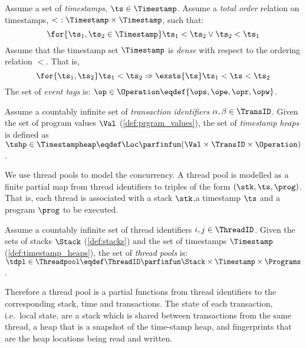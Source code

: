 \begin{definition}\label{def:timestamp_heaps}
Assume a set of \emph{timestamps}, $\ts \in \Timestamp$. Assume a \emph{total order} relation on timestamps, $<\ : \Timestamp \times \Timestamp$, such that:
%
\[
	\for{\ts_1, \ts_2 \in \Timestamp} \ts_1 < \ts_2 \lor \ts_2 < \ts_1
\]
%
Assume that the timestamp set $\Timestamp$ is \emph{dense} with respect to the ordering relation $<$. That is,
\[
	\for{\ts_1, \ts_2} \ts_1 < \ts_2 
	\Rightarrow 
	\exsts{\ts} \ts_1 < \ts < \ts_2	
\]
%
The set of \emph{event tags} is: $\op \in \Operation \eqdef \{\ops, \ope, \opr, \opw \}$. 

\noindent Assume a countably infinite set of \emph{transaction identifiers} $\alpha, \beta \in \TransID$.
Given the set of program values $\Val$ (\ref{def:prgram_values}), the set of \emph{timestamp heaps} is defined as $\tshp \in \Timestampheap \eqdef \Loc \parfinfun (\Val \times \TransID \times \Operation)$.
\end{definition}

We use thread pools to model the concurrency.
A thread pool is modelled as a finite partial map from thread identifiers to triples of the form $(\stk, \ts, \prog)$. That is, each thread is associated with a stack $\stk$,a timestamp $\ts$ and a program $\prog$ to be executed. 

\begin{definition}
Assume a countably infinite set of thread identifiers $i,j \in \ThreadID$.
Given the sets of stacks $\Stack$ (\ref{def:stacks}) and the set of timestamps $\Timestamp$ (\ref{def:timestamp_heaps}), the set of \emph{thread pools} is: $\tdpl \in \Threadpool \eqdef \ThreadID \parfinfun \Stack \times \Timestamp \times \Programs$.
\end{definition}
%
%
Therefore a thread pool is a partial functions from thread identifiers to the corresponding stack, time and transactions.
The state of each transaction, i.e.\ local state, are a stack which is shared between transactions from the same thread, a heap that is a  snapshot of the time-stamp heap, and fingerprints that are the heap locations being read and written.


